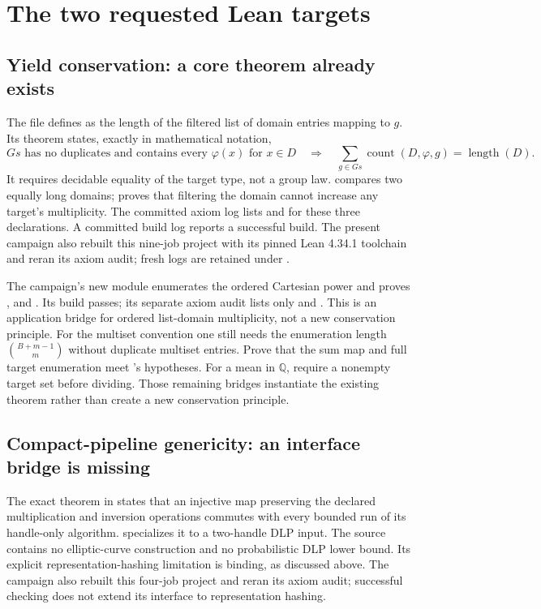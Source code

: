\section{The two requested Lean targets}\label{sec:formal}

\subsection{Yield conservation: a core theorem already exists}
The file
defines  as the length of the filtered list of domain
entries mapping to $g$. Its theorem  states, exactly in
mathematical notation,
\[
 \text{$Gs$ has no duplicates and contains every $\varphi(x)$ for $x\in D$}
 \quad\Longrightarrow\quad
 \sum_{g\in Gs}\operatorname{count}(D,\varphi,g)=\operatorname{length}(D).
\]
It requires decidable equality of the target type, not a group law.
 compares two equally long domains;
 proves that filtering the domain cannot increase
any target's multiplicity. The committed axiom log lists
 and  for these three declarations. A
committed build log reports a successful build. The present campaign also
rebuilt this nine-job project with its pinned Lean 4.34.1 toolchain and
reran its axiom audit; fresh logs are retained under
.

The campaign's new  module enumerates the
ordered Cartesian power and proves ,
 and . Its build
passes; its separate axiom audit lists only  and
. This is an application bridge for ordered list-domain
multiplicity, not a new conservation principle.
For the multiset convention one still needs the enumeration length
$\binom{B+m-1}{m}$ without duplicate multiset entries. Prove that the
sum map and full target enumeration meet 's hypotheses.
For a mean in $\mathbb Q$, require a nonempty target set before dividing.
Those remaining bridges instantiate the existing theorem rather than create
a new conservation principle.

\subsection{Compact-pipeline genericity: an interface bridge is missing}
The exact theorem  in
states that an injective map preserving the declared multiplication and
inversion operations commutes with every bounded run of its handle-only
algorithm.  specializes it to a two-handle DLP input.
The source contains no elliptic-curve construction and no probabilistic
DLP lower bound. Its explicit representation-hashing limitation is
binding, as discussed above.
The campaign also rebuilt this four-job project and reran its axiom audit;
successful checking does not extend its interface to representation hashing.

